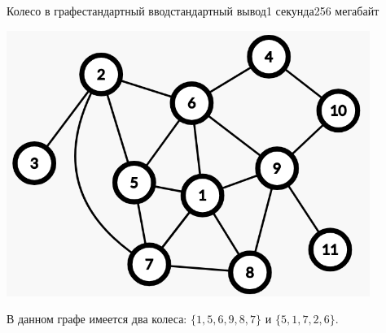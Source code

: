 \begin{problem}{Колесо в графе}{стандартный ввод}{стандартный вывод}{1 секунда}{256 мегабайт}
\begin{center}
\includegraphics[scale=0.35]{image3.png}
\end{center}

В данном графе имеется два колеса: $\{1, 5, 6, 9, 8, 7\}$ и $\{5, 1, 7, 2, 6\}$.

\end{problem}

